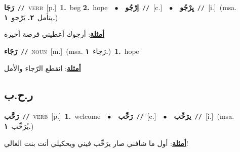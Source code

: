 \documentclass[10pt,a4paper,twoside]{article} %
\begin{document}
\begin{multicols}{2}
{\setlength\topsep{0pt}\textbf{\foreignlanguage{arabic}{رَجَا}}\ {\color{gray}\texttt{//}\color{black}}\ \textsc{verb}\ [p.]\ \textbf{1.}~beg  \textbf{2.}~hope\ \ $\bullet$\ \ \setlength\topsep{0pt}\textbf{\foreignlanguage{arabic}{اِرْجُو}}\ {\color{gray}\texttt{//}\color{black}}\ [c.]\ \ $\bullet$\ \ \setlength\topsep{0pt}\textbf{\foreignlanguage{arabic}{يِرْجُو}}\ {\color{gray}\texttt{//}\color{black}}\ [i.]\ \color{gray}(msa. \foreignlanguage{arabic}{يتأمل}~\foreignlanguage{arabic}{\textbf{٢.}}  \foreignlanguage{arabic}{يَرْجو}~\foreignlanguage{arabic}{\textbf{١.}})\color{black}\  \begin{flushright}\color{gray}\foreignlanguage{arabic}{\textbf{\underline{\foreignlanguage{arabic}{أمثلة}}}: أرجوك أعطيني فرصة أخيرة}\end{flushright}\color{black}} \vspace{2mm}

{\setlength\topsep{0pt}\textbf{\foreignlanguage{arabic}{رَجَاء}}\ {\color{gray}\texttt{//}\color{black}}\ \textsc{noun}\ [m.]\ \color{gray}(msa. \foreignlanguage{arabic}{رَجاء}~\foreignlanguage{arabic}{\textbf{١.}})\color{black}\ \textbf{1.}~hope\  \begin{flushright}\color{gray}\foreignlanguage{arabic}{\textbf{\underline{\foreignlanguage{arabic}{أمثلة}}}: انقطع الرّجاء والأمل}\end{flushright}\color{black}} \vspace{2mm}

\vspace{-3mm}
\subsection*{\color{blue}\foreignlanguage{arabic}{ر.ح.ب}\color{blue}{}} 

{\setlength\topsep{0pt}\textbf{\foreignlanguage{arabic}{رَحَّب}}\ {\color{gray}\texttt{//}\color{black}}\ \textsc{verb}\ [p.]\ \textbf{1.}~welcome\ \ $\bullet$\ \ \setlength\topsep{0pt}\textbf{\foreignlanguage{arabic}{رَحِّب}}\ {\color{gray}\texttt{//}\color{black}}\ [c.]\ \ $\bullet$\ \ \setlength\topsep{0pt}\textbf{\foreignlanguage{arabic}{يرَحِّب}}\ {\color{gray}\texttt{//}\color{black}}\ [i.]\ \color{gray}(msa. \foreignlanguage{arabic}{يُرَحِّب}~\foreignlanguage{arabic}{\textbf{١.}})\color{black}\  \begin{flushright}\color{gray}\foreignlanguage{arabic}{\textbf{\underline{\foreignlanguage{arabic}{أمثلة}}}: أول ما شافني صار يرَحِّب فيني ويحكيلي أنت بنت الغالي!}\end{flushright}\color{black}} \vspace{2mm}


\end{multicols}
\end{document}
